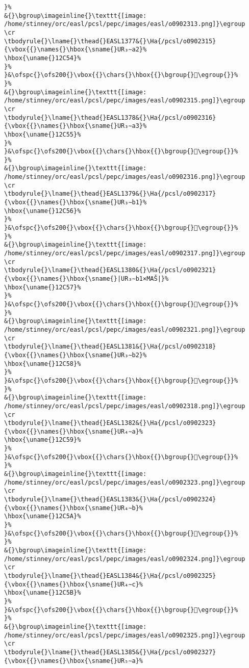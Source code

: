 \begin{verbatim}
}%
&{}\bgroup\imageinline{}\texttt{[image: /home/stinney/orc/easl/pcsl/pepc/images/easl/o0902313.png]}\egroup
\cr
\tbodyrule{}\lname{}\thead{}EASL1377&{}\Ha{/pcsl/o0902315}{\vbox{{}\names{}\hbox{\sname{}UR₃∼a2}%
\hbox{\uname{}12C54}%
}%
}&\ofspc{}\ofs200{}\vbox{{}\chars{}\hbox{{}\bgroup{}𒱔\egroup{}}%
}%
&{}\bgroup\imageinline{}\texttt{[image: /home/stinney/orc/easl/pcsl/pepc/images/easl/o0902315.png]}\egroup
\cr
\tbodyrule{}\lname{}\thead{}EASL1378&{}\Ha{/pcsl/o0902316}{\vbox{{}\names{}\hbox{\sname{}UR₃∼a3}%
\hbox{\uname{}12C55}%
}%
}&\ofspc{}\ofs200{}\vbox{{}\chars{}\hbox{{}\bgroup{}𒱕\egroup{}}%
}%
&{}\bgroup\imageinline{}\texttt{[image: /home/stinney/orc/easl/pcsl/pepc/images/easl/o0902316.png]}\egroup
\cr
\tbodyrule{}\lname{}\thead{}EASL1379&{}\Ha{/pcsl/o0902317}{\vbox{{}\names{}\hbox{\sname{}UR₃∼b1}%
\hbox{\uname{}12C56}%
}%
}&\ofspc{}\ofs200{}\vbox{{}\chars{}\hbox{{}\bgroup{}𒱖\egroup{}}%
}%
&{}\bgroup\imageinline{}\texttt{[image: /home/stinney/orc/easl/pcsl/pepc/images/easl/o0902317.png]}\egroup
\cr
\tbodyrule{}\lname{}\thead{}EASL1380&{}\Ha{/pcsl/o0902321}{\vbox{{}\names{}\hbox{\sname{}|UR₃∼b1×MAŠ|}%
\hbox{\uname{}12C57}%
}%
}&\ofspc{}\ofs200{}\vbox{{}\chars{}\hbox{{}\bgroup{}𒱗\egroup{}}%
}%
&{}\bgroup\imageinline{}\texttt{[image: /home/stinney/orc/easl/pcsl/pepc/images/easl/o0902321.png]}\egroup
\cr
\tbodyrule{}\lname{}\thead{}EASL1381&{}\Ha{/pcsl/o0902318}{\vbox{{}\names{}\hbox{\sname{}UR₃∼b2}%
\hbox{\uname{}12C58}%
}%
}&\ofspc{}\ofs200{}\vbox{{}\chars{}\hbox{{}\bgroup{}𒱘\egroup{}}%
}%
&{}\bgroup\imageinline{}\texttt{[image: /home/stinney/orc/easl/pcsl/pepc/images/easl/o0902318.png]}\egroup
\cr
\tbodyrule{}\lname{}\thead{}EASL1382&{}\Ha{/pcsl/o0902323}{\vbox{{}\names{}\hbox{\sname{}UR₄∼a}%
\hbox{\uname{}12C59}%
}%
}&\ofspc{}\ofs200{}\vbox{{}\chars{}\hbox{{}\bgroup{}𒱙\egroup{}}%
}%
&{}\bgroup\imageinline{}\texttt{[image: /home/stinney/orc/easl/pcsl/pepc/images/easl/o0902323.png]}\egroup
\cr
\tbodyrule{}\lname{}\thead{}EASL1383&{}\Ha{/pcsl/o0902324}{\vbox{{}\names{}\hbox{\sname{}UR₄∼b}%
\hbox{\uname{}12C5A}%
}%
}&\ofspc{}\ofs200{}\vbox{{}\chars{}\hbox{{}\bgroup{}𒱚\egroup{}}%
}%
&{}\bgroup\imageinline{}\texttt{[image: /home/stinney/orc/easl/pcsl/pepc/images/easl/o0902324.png]}\egroup
\cr
\tbodyrule{}\lname{}\thead{}EASL1384&{}\Ha{/pcsl/o0902325}{\vbox{{}\names{}\hbox{\sname{}UR₄∼c}%
\hbox{\uname{}12C5B}%
}%
}&\ofspc{}\ofs200{}\vbox{{}\chars{}\hbox{{}\bgroup{}𒱛\egroup{}}%
}%
&{}\bgroup\imageinline{}\texttt{[image: /home/stinney/orc/easl/pcsl/pepc/images/easl/o0902325.png]}\egroup
\cr
\tbodyrule{}\lname{}\thead{}EASL1385&{}\Ha{/pcsl/o0902327}{\vbox{{}\names{}\hbox{\sname{}UR₅∼a}%

\end{verbatim}
